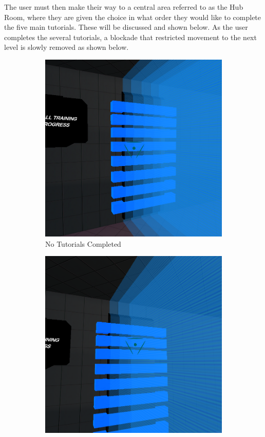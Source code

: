 \noindent The user must then make their way to a central area referred to as the Hub Room, where they are given the choice in what order they would like to complete the five main tutorials. These will be discussed and shown below. As the user completes the several tutorials, a blockade that restricted movement to the next level is slowly removed as shown below.

\begin{figure}[H]
\centering
\begin{subfigure}{0.3\textwidth}
  \centering
  \includegraphics[width=0.9\linewidth]{Figures/barrier5.png}
  \caption{No Tutorials Completed}
\end{subfigure}%
\begin{subfigure}{0.3\textwidth}
  \centering
  \includegraphics[width=0.9\linewidth]{Figures/barrier3.png}

\end{subfigure}
\end{figure}

